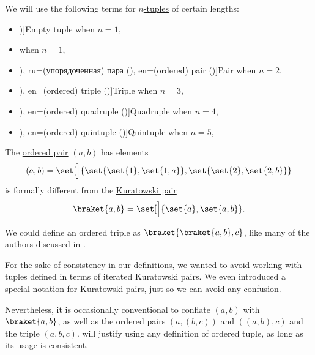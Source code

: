 \begin{definition}\label{def:ordered_tuple_length_terminology}
  We will use the following terms for \hyperref[def:ordered_tuple]{\( n \)-tuples} of certain lengths:
  \begin{itemize}
    \item \term[en=empty tuple (\cite[example 3.5.10]{Tao2022AnalysisI})]{Empty tuple} when \( n = 1 \),
    \item {} when \( n = 1 \),
    \item \term[bg=наредена двойка (\cite[367]{ГеновМиховскиМоллов1991Алгебра}), ru=(упорядоченная) пара (\cite[38]{БелоусовТкачёв2004ДискретнаяМатематика}), en=(ordered) pair (\cite[23]{Halmos1960NaiveSetTheory})]{Pair} when \( n = 2 \),
    \item \term[ru=(упорядоченная) тройка (\cite[39]{БелоусовТкачёв2004ДискретнаяМатематика}), en=(ordered) triple (\cite[42]{Enderton1977SetTheory})]{Triple} when \( n = 3 \),
    \item \term[ru=(упорядоченная) четвёрка (\cite[39]{БелоусовТкачёв2004ДискретнаяМатематика}), en=(ordered) quadruple (\cite[42]{Enderton1977SetTheory})]{Quadruple} when \( n = 4 \),
    \item \term[ru=(упорядоченная) пятёрка (\cite[39]{БелоусовТкачёв2004ДискретнаяМатематика}), en=(ordered) quintuple (\cite[42]{Enderton1977SetTheory})]{Quintuple} when \( n = 5 \),
  \end{itemize}
\end{definition}

\begin{remark}\label{rem:kuratowski_pairs_and_tuples}
  The \hyperref[def:ordered_tuple]{ordered pair} \( (a, b) \) has elements
  \begin{equation*}
    (a, b) = \set[\Big]{ \set{ \set{ 1 }, \set{ 1, a } }, \set{ \set{ 2 }, \set{ 2, b } } }
  \end{equation*}
  is formally different from the \hyperref[def:kuratowski_pair]{Kuratowski pair}
  \begin{equation*}
    \braket{ a, b } = \set[\Big]{ \set{ a }, \set{ a, b } }.
  \end{equation*}

  We could define an ordered triple as \( \braket{ \braket{ a, b }, c } \), like many of the authors discussed in .

  For the sake of consistency in our definitions, we wanted to avoid working with tuples defined in terms of iterated Kuratowski pairs. We even introduced a special notation for Kuratowski pairs, just so we can avoid any confusion.

  Nevertheless, it is occasionally conventional to conflate \( (a, b) \) with \( \braket{ a, b } \), as well as the ordered pairs \( (a, (b, c)) \) and \( ((a, b), c) \) and the triple \( (a, b, c) \).  will justify using any definition of ordered tuple, as long as its usage is consistent.
\end{remark}

